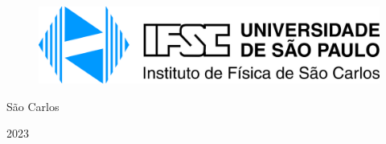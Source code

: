 \begin{figure}[t!]
    \includegraphics[height=0.2\textwidth]{document_configurations/images/ifsc-logo.jpg}
\end{figure}
\thispagestyle{empty}
\vspace*{\fill}
\begin{center}
São Carlos

2023
\end{center}
\newpage
